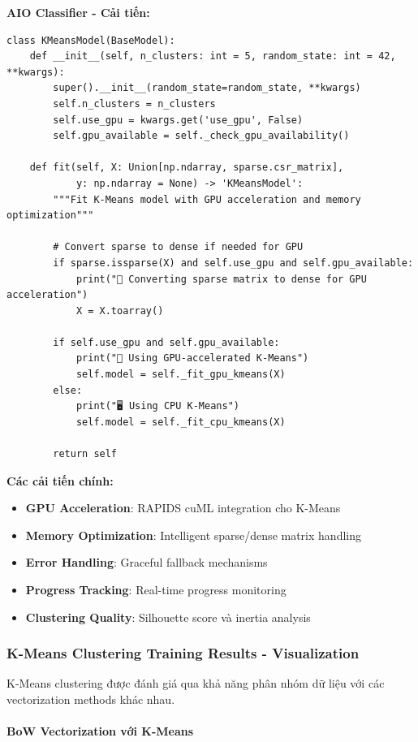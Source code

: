 \textbf{AIO Classifier - Cải tiến:}
\begin{verbatim}
class KMeansModel(BaseModel):
    def __init__(self, n_clusters: int = 5, random_state: int = 42, **kwargs):
        super().__init__(random_state=random_state, **kwargs)
        self.n_clusters = n_clusters
        self.use_gpu = kwargs.get('use_gpu', False)
        self.gpu_available = self._check_gpu_availability()
        
    def fit(self, X: Union[np.ndarray, sparse.csr_matrix], 
            y: np.ndarray = None) -> 'KMeansModel':
        """Fit K-Means model with GPU acceleration and memory optimization"""
        
        # Convert sparse to dense if needed for GPU
        if sparse.issparse(X) and self.use_gpu and self.gpu_available:
            print("🔄 Converting sparse matrix to dense for GPU acceleration")
            X = X.toarray()
        
        if self.use_gpu and self.gpu_available:
            print("🚀 Using GPU-accelerated K-Means")
            self.model = self._fit_gpu_kmeans(X)
        else:
            print("🖥️ Using CPU K-Means")
            self.model = self._fit_cpu_kmeans(X)
        
        return self
\end{verbatim}

\textbf{Các cải tiến chính:}
\begin{itemize}
    \item \textbf{GPU Acceleration}: RAPIDS cuML integration cho K-Means
    \item \textbf{Memory Optimization}: Intelligent sparse/dense matrix handling
    \item \textbf{Error Handling}: Graceful fallback mechanisms
    \item \textbf{Progress Tracking}: Real-time progress monitoring
    \item \textbf{Clustering Quality}: Silhouette score và inertia analysis
\end{itemize}

\subsubsection{K-Means Clustering Training Results - Visualization}

K-Means clustering được đánh giá qua khả năng phân nhóm dữ liệu với các vectorization methods khác nhau.

\paragraph{BoW Vectorization với K-Means}

